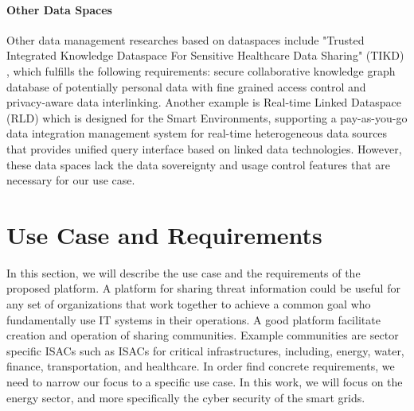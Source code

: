\documentclass{article}
\begin{document}
\paragraph{Other Data Spaces}
Other data management researches based on dataspaces include "Trusted Integrated Knowledge Dataspace For Sensitive Healthcare Data Sharing" (TIKD)  \cite{hernandez_tikd_2021}, which fulfills the following requirements: secure collaborative knowledge graph database of potentially personal data with fine grained access control and privacy-aware data interlinking.
Another example is Real-time Linked Dataspace (RLD) \cite{curry_real-time_2019} which is designed for the Smart Environments, supporting a pay-as-you-go data integration management system for real-time heterogeneous data sources that provides unified query interface based on linked data technologies.
However, these data spaces lack the data sovereignty and usage control features that are necessary for our use case.



\section{Use Case and Requirements} %
\label{sec:use-case}




In this section, we will describe the use case and the requirements of the proposed platform. 
A platform for sharing threat information could be useful for any set of organizations that work together to achieve a common goal who fundamentally use IT systems in their operations. A good platform facilitate creation and operation of sharing communities. Example communities are sector specific ISACs such as ISACs for critical infrastructures, including, energy, water, finance, transportation, and healthcare. In order find concrete requirements, we need to narrow our focus to a specific use case. In this work, we will focus on the energy sector, and more specifically the cyber security of the smart grids.
\end{document}
